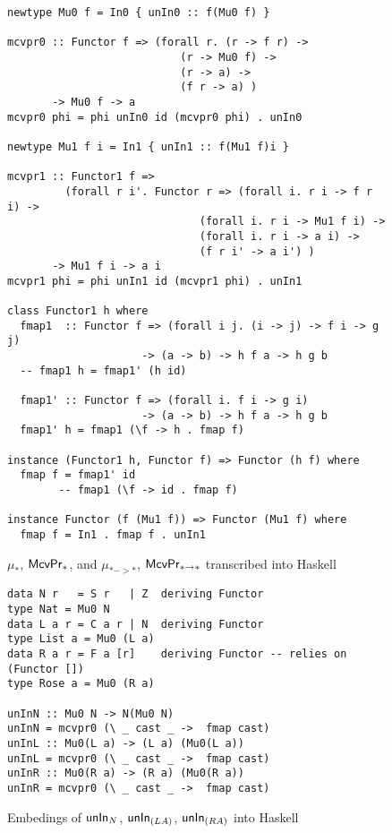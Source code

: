 \begin{figure}
\begin{singlespace}
\begin{lstlisting}
newtype Mu0 f = In0 { unIn0 :: f(Mu0 f) }

mcvpr0 :: Functor f => (forall r. (r -> f r) ->
                           (r -> Mu0 f) ->
                           (r -> a) ->
                           (f r -> a) )
       -> Mu0 f -> a
mcvpr0 phi = phi unIn0 id (mcvpr0 phi) . unIn0

newtype Mu1 f i = In1 { unIn1 :: f(Mu1 f)i }

mcvpr1 :: Functor1 f =>
         (forall r i'. Functor r => (forall i. r i -> f r i) ->
                              (forall i. r i -> Mu1 f i) ->
                              (forall i. r i -> a i) ->
                              (f r i' -> a i') )
       -> Mu1 f i -> a i
mcvpr1 phi = phi unIn1 id (mcvpr1 phi) . unIn1

class Functor1 h where
  fmap1  :: Functor f => (forall i j. (i -> j) -> f i -> g j)
                     -> (a -> b) -> h f a -> h g b
  -- fmap1 h = fmap1' (h id)

  fmap1' :: Functor f => (forall i. f i -> g i)
                     -> (a -> b) -> h f a -> h g b
  fmap1' h = fmap1 (\f -> h . fmap f)

instance (Functor1 h, Functor f) => Functor (h f) where
  fmap f = fmap1' id
        -- fmap1 (\f -> id . fmap f)

instance Functor (f (Mu1 f)) => Functor (Mu1 f) where
  fmap f = In1 . fmap f . unIn1
\end{lstlisting}
\end{singlespace}
\caption{$\mu_{*}$, $\mathsf{McvPr}_{*}$, and $\mu_{* -> *}$, $\mathsf{McvPr}_{* -> *}$
	transcribed into Haskell}
\label{fig:HaskellFunctor1}
\end{figure}

\begin{figure}
\begin{lstlisting}
data N r   = S r   | Z  deriving Functor
type Nat = Mu0 N
data L a r = C a r | N  deriving Functor
type List a = Mu0 (L a)
data R a r = F a [r]    deriving Functor -- relies on (Functor [])
type Rose a = Mu0 (R a)

unInN :: Mu0 N -> N(Mu0 N)
unInN = mcvpr0 (\ _ cast _ ->  fmap cast)
unInL :: Mu0(L a) -> (L a) (Mu0(L a))
unInL = mcvpr0 (\ _ cast _ ->  fmap cast)
unInR :: Mu0(R a) -> (R a) (Mu0(R a))
unInR = mcvpr0 (\ _ cast _ ->  fmap cast)
\end{lstlisting}
\label{fig:HaskellunInRegular}
\caption{Embedings of $\mathsf{unIn}_N$, $\mathsf{unIn}_{(L A)}$, $\mathsf{unIn}_{(R A)}$ into Haskell}
\end{figure}

